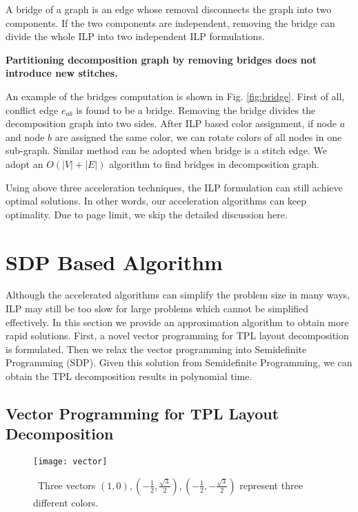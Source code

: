 \documentclass[10pt,conference]{IEEEtran}
\begin{document}
A bridge of a graph is an edge whose removal disconnects the graph into two components.
If the two components are independent, removing the bridge can divide the whole ILP into two independent ILP formulations.

\begin{theorem}
\textbf{Partitioning decomposition graph by removing bridges does not introduce new stitches.}
\end{theorem}

An example of the bridges computation is shown in Fig. \ref{fig:bridge}.
First of all, conflict edge $e_{ab}$ is found to be a bridge. Removing the bridge divides the decomposition graph into two sides.
After ILP based color assignment, if node $a$ and node $b$ are assigned the same color,  we can rotate colors of all nodes in one sub-graph. Similar method can be adopted when bridge is a stitch edge.
We adopt an $O(|V|+|E|)$ algorithm \cite{1974Tarjan} to find bridges in decomposition graph.

Using above three acceleration techniques, the ILP formulation can still achieve optimal solutions.
In other words, our acceleration algorithms can keep optimality.
Due to page limit, we skip the detailed discussion here.

 \section{SDP Based Algorithm}
\label{chap:SDP}

Although  the accelerated algorithms can simplify the problem size in many ways, ILP may still be too slow for large problems which cannot be simplified effectively.
In this section we provide an approximation algorithm to obtain more rapid solutions.
First, a novel vector programming for TPL layout decomposition is formulated.
Then we relax the vector programming into Semidefinite Programming (SDP).
Given this solution from Semidefinite Programming, we can obtain the TPL decomposition results in polynomial time.





\subsection{Vector Programming for TPL Layout Decomposition}

\begin{figure}[tb]
	\centering
	\texttt{[image: vector]}
\caption{~Three vectors $(1, 0), (-\frac{1}{2}, \frac{\sqrt{3}}{2}), (-\frac{1}{2}, -\frac{\sqrt{3}}{2})$ represent three different colors.}
	\label{fig:vector}
\end{figure}
\end{document}
